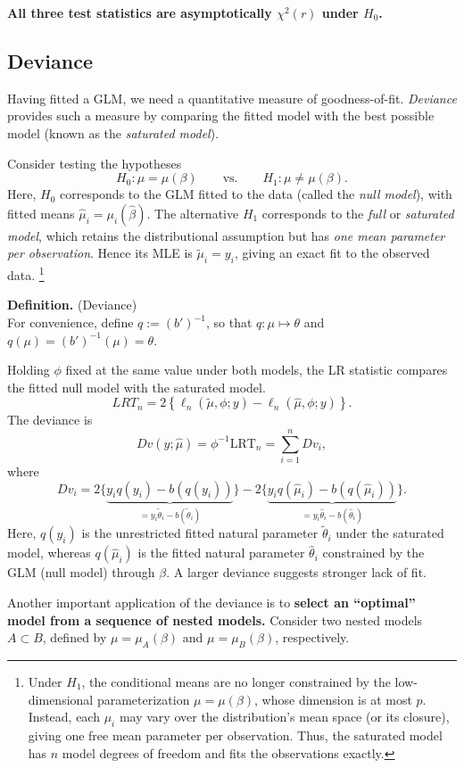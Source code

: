 \documentclass{article}
\theoremstyle{break}
\begin{document}
\textbf{All three test statistics are asymptotically $\chi^2(r)$ under $H_0$.}


\subsection{Deviance}
Having fitted a GLM, we need a quantitative measure of goodness-of-fit. \emph{Deviance} provides such a measure by comparing the fitted model with the best possible model (known as the \emph{saturated model}).

Consider testing the hypotheses
\[
  H_0:\mu=\mu(\beta)
  \qquad\text{vs.}\qquad
  H_1:\mu\ne\mu(\beta).
\]
Here, $H_0$ corresponds to the GLM fitted to the data (called the \emph{null model}), with fitted means $\hat\mu_i=\mu_i(\hat\beta)$. 
The alternative $H_1$ corresponds to the \emph{full} or \emph{saturated model}, which retains the distributional assumption but has \emph{one mean parameter per observation}. Hence its MLE is $\tilde\mu_i=y_i$, giving an exact fit to the observed data.
\footnote{Under $H_1$, the conditional means are no longer constrained by the low-dimensional parameterization $\mu=\mu(\beta)$, whose dimension is at most $p$. Instead, each $\mu_i$ may vary over the distribution's mean space (or its closure), giving one free mean parameter per observation. Thus, the saturated model has $n$ model degrees of freedom and fits the observations exactly.}


\textbf{Definition.} (Deviance) \\
For convenience, define $q := (b')^{-1}$, so that $q:\mu\mapsto\theta$ and $q(\mu)=(b')^{-1}(\mu) = \theta$.

Holding $\phi$ fixed at the same value under both models, the LR statistic compares the fitted null model with the saturated model.
\[
  LRT_n
  =2\left\{
    \ell_n(\tilde\mu,\phi;y)
    -\ell_n(\hat\mu,\phi;y)
  \right\}.
\]
The deviance is
\[
  Dv(y;\hat\mu)
  =\phi^{-1}\mathrm{LRT}_n
  =\sum_{i=1}^n Dv_i,
\]
where
\[
  Dv_i
  =2\{
    \underbrace{y_i q(y_i)-b(q(y_i))}_{= y_i \tilde\theta_i - b(\tilde\theta_i)}
  \}
  -2\{
    \underbrace{y_i q(\hat\mu_i)-b(q(\hat\mu_i))}_{=y_i \hat\theta_i - b(\hat\theta_i)}
  \}.
\]
Here, $q(y_i)$ is the unrestricted fitted natural parameter $\tilde\theta_i$ under the saturated model, whereas $q(\hat\mu_i)$ is the fitted natural parameter $\hat\theta_i$ constrained by the GLM (null model) through $\beta$. A larger deviance suggests stronger lack of fit.

Another important application of the deviance is to \textbf{select an ``optimal'' model from a sequence of nested models.}
Consider two nested models $A \subset B$, defined by $\mu = \mu_A(\beta)$ and $\mu = \mu_B(\beta)$, respectively. 
\end{document}
